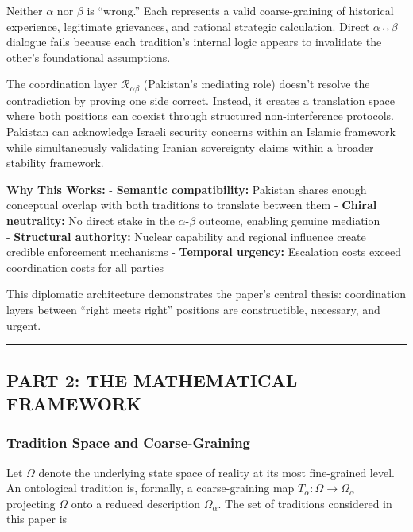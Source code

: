 \documentclass[
]{article}
\begin{document}
Neither \(\alpha\) nor \(\beta\) is ``wrong.'' Each represents a valid coarse-graining of
historical experience, legitimate grievances, and rational strategic
calculation. Direct \(\alpha\)↔\(\beta\) dialogue fails because each tradition's internal
logic appears to invalidate the other's foundational assumptions.

The coordination layer \(\mathcal{R}_{\alpha\beta}\) (Pakistan's
mediating role) doesn't resolve the contradiction by proving one side
correct. Instead, it creates a translation space where both positions
can coexist through structured non-interference protocols. Pakistan can
acknowledge Israeli security concerns within an Islamic framework while
simultaneously validating Iranian sovereignty claims within a broader
stability framework.

\textbf{Why This Works:} - \textbf{Semantic compatibility:} Pakistan
shares enough conceptual overlap with both traditions to translate
between them - \textbf{Chiral neutrality:} No direct stake in the \(\alpha\)-\(\beta\)
outcome, enabling genuine mediation\\
- \textbf{Structural authority:} Nuclear capability and regional
influence create credible enforcement mechanisms - \textbf{Temporal
urgency:} Escalation costs exceed coordination costs for all parties

This diplomatic architecture demonstrates the paper's central thesis:
coordination layers between ``right meets right'' positions are
constructible, necessary, and urgent.

\begin{center}\rule{0.5\linewidth}{0.5pt}\end{center}

\subsection{PART 2: THE MATHEMATICAL
FRAMEWORK}\label{part-2-the-mathematical-framework}

\subsubsection{Tradition Space and
Coarse-Graining}\label{tradition-space-and-coarse-graining}

Let \(\Omega\) denote the underlying state space of reality at its most
fine-grained level. An ontological tradition is, formally, a
coarse-graining map \(T_\alpha : \Omega \to \Omega_\alpha\) projecting
\(\Omega\) onto a reduced description \(\Omega_\alpha\). The set of
traditions considered in this paper is
\end{document}
